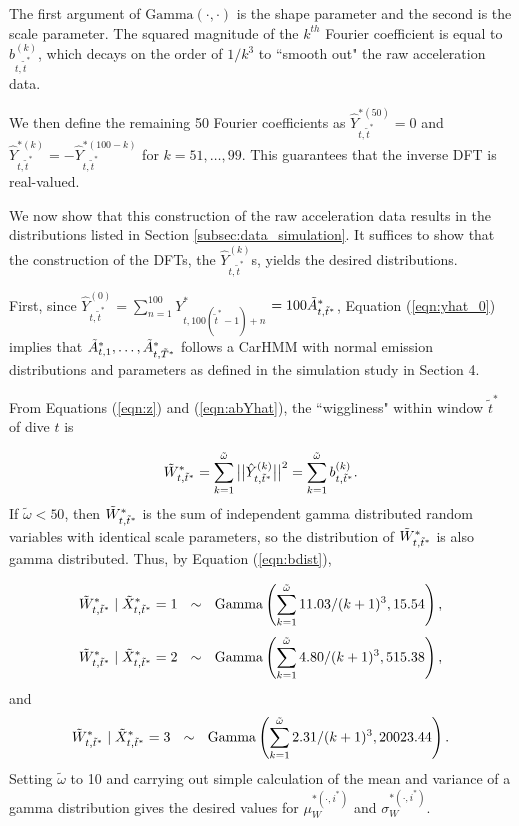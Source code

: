 The first argument of $\mathrm{Gamma}(\cdot,\cdot)$ is the shape parameter and the second is the scale parameter. The squared magnitude of the $k^{th}$ Fourier coefficient is equal to $b^{(k)}_{t,\tilde t^*}$, which decays on the order of $1/k^3$ to ``smooth out" the raw acceleration data.

We then define the remaining 50 Fourier coefficients as $\hat{Y}^{*(50)}_{t,\tilde t^*} = 0$ and $\hat{Y}^{*(k)}_{t,\tilde t^*} = -\hat{Y}^{*(100-k)}_{t,\tilde t^*}$ for $k = 51,\ldots,99$. This guarantees that the inverse DFT is real-valued. 
  

We now show that this construction of the raw acceleration data results in the distributions listed in Section \ref{subsec:data_simulation}. It suffices to show that the construction of the DFTs, the $\hat{Y}^{(k)}_{t,\tilde t^*}$s, yields the desired distributions.

First, since $\hat{Y}^{(0)}_{t,\tilde t^*} = \sum_{n=1}^{100} Y^*_{t,100(\tilde t^* - 1) + n} $ $=100\tilde{A}^*_{t,\tilde{t}^*}$, Equation (\ref{eqn:yhat_0}) implies that 
$\tilde{A}^*_{t,1}, \ldots, \tilde{A}^*_{t,\tilde{T}^*}$ 
follows a CarHMM with normal emission distributions and parameters as defined in the simulation study in Section 4.

From Equations (\ref{eqn:z}) and (\ref{eqn:abYhat}), 
the ``wiggliness" within window $\tilde t^*$ of dive $t$ is 

\[
    \tilde{W}^*_{t,\tilde t^*} = \sum_{k=1}^{\tilde \omega} \big|\big|\hat{Y}^{(k)}_{t,\tilde t^*}\big|\big|^2 =  \sum_{k=1}^{\tilde \omega} b^{(k)}_{t,\tilde t^*}.
\]
%
If $\tilde \omega < 50$, then $\tilde{W}^*_{t,\tilde t^*}$ is the sum of independent gamma distributed random variables with identical scale parameters, so the distribution of $\tilde{W}^*_{t,\tilde t^*}$ is also gamma distributed. Thus, by Equation (\ref{eqn:bdist}),

\[
    \tilde{W}^*_{t,\tilde t^*} \mid \tilde X^*_{t,\tilde t^*} = 1  ~~ \sim ~~ {\rm{Gamma}}\left(\sum_{k=1}^{\tilde \omega} 11.03/(k+1)^3 , 15.54 \right),
\]
%
\[
    \tilde{W}^*_{t,\tilde t^*} \mid \tilde X^*_{t,\tilde t^*} = 2 ~~\sim~~ {\rm{Gamma}}\left(\sum_{k=1}^{\tilde \omega} 4.80/(k+1)^3 , 515.38 \right),
\]
and
\[
    \tilde{W}^*_{t,\tilde t^*} \mid \tilde X^*_{t,\tilde t^*} = 3  ~~ \sim ~~ {\rm{Gamma}}\left(\sum_{k=1}^{\tilde \omega} 2.31/(k+1)^3 , 20023.44 \right).
\]
Setting $\tilde \omega$ to 10 and carrying out simple calculation of the mean and variance of a gamma distribution gives the desired values for $\mu_W^{*(\cdot,i^*)}$ and $\sigma_W^{*(\cdot,i^*)}$.

